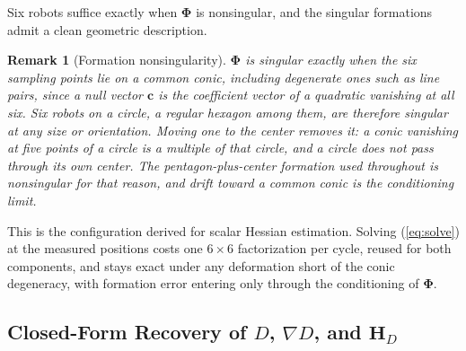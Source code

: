 \documentclass[lettersize,journal]{IEEEtran}
\newtheorem{remark}{Remark}
\begin{document}
Six robots suffice exactly when $\boldsymbol{\Phi}$ is nonsingular, and
the singular formations admit a clean geometric description.

\begin{remark}[Formation nonsingularity]
\label{rem:conic}
$\boldsymbol{\Phi}$ is singular exactly when the six sampling points lie
on a common conic, including degenerate ones such as line pairs, since a
null vector $\mathbf{c}$ is the coefficient vector of a quadratic
vanishing at all six. Six robots on a circle, a regular hexagon among
them, are therefore singular at any size or orientation. Moving one to
the center removes it: a conic vanishing at five points of a circle is a
multiple of that circle, and a circle does not pass through its own
center. The pentagon-plus-center formation used throughout is
nonsingular for that reason, and drift toward a common conic is the
conditioning limit.
\end{remark}

This is the configuration \cite{6} derived for scalar Hessian
estimation. Solving (\ref{eq:solve}) at the measured positions costs one
$6 \times 6$ factorization per cycle, reused for
both components, and stays exact under any deformation short of the
conic degeneracy, with formation error entering only through the
conditioning of $\boldsymbol{\Phi}$.

\subsection{Closed-Form Recovery of $D$, $\nabla D$, and $\mathbf{H}_D$}
\end{document}
